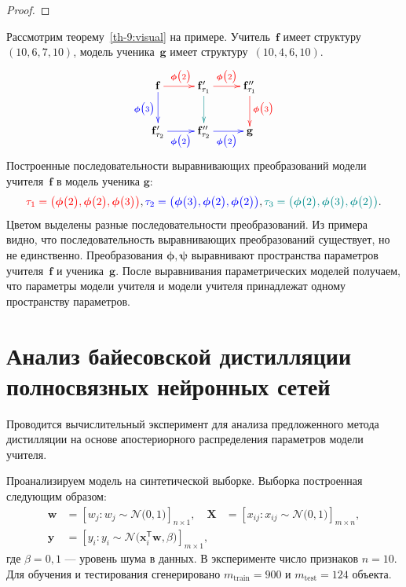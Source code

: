 \begin{proof}
\end{proof}

Рассмотрим теорему~\ref{th-9:visual} на примере. Учитель~$\mathbf{f}$ имеет структуру~$(10, 6, 7, 10)$, модель ученика~$\mathbf{g}$ имеет структуру~$(10,4,6,10)$.
\[
\xymatrix{
\mathbf{f}\ar@[blue][d]_{\color{blue}\bm{\phi}\bigr(3\bigr)}\ar@[red][r]^{\color{red}\bm{\phi}\bigr(2\bigr)}
& 
\mathbf{f}_{\tau_1}'\ar@[darkcyan][d]\ar@[red][r]^{\color{red}\bm{\phi}\bigr(2\bigr)}
&
\mathbf{f}_{\tau_1}''\ar@[red][d]^{\color{red}\bm{\phi}\bigr(3\bigr)}
\\
\mathbf{f}_{\tau_2}'\ar@[blue][r]_{\color{blue}\bm{\phi}\bigr(2\bigr)}
& 
\mathbf{f}_{\tau_2}''\ar@[blue][r]_{\color{blue}\bm{\phi}\bigr(2\bigr)}
&
\mathbf{g}
}
\]
Построенные последовательности выравнивающих преобразований модели учителя~$\mathbf{f}$ в модель ученика $\mathbf{g}$:
\[
{\color{red}\tau_1=\left(\bm{\phi}\bigr(2\bigr), \bm{\phi}\bigr(2\bigr), \bm{\phi}\bigr(3\bigr)\right)}, {\color{blue}\tau_2=\left(\bm{\phi}\bigr(3\bigr), \bm{\phi}\bigr(2\bigr), \bm{\phi}\bigr(2\bigr)\right)}, {\color{darkcyan}\tau_3=\left(\bm{\phi}\bigr(2\bigr), \bm{\phi}\bigr(3\bigr), \bm{\phi}\bigr(2\bigr)\right)}.
\]
Цветом выделены разные последовательности преобразований.
Из примера видно, что последовательность выравнивающих преобразований существует, но не единственно. Преобразования $\bm{\phi}, \bm{\psi}$ выравнивают пространства параметров учителя~$\mathbf{f}$ и ученика~$\mathbf{g}$. После выравнивания параметрических моделей получаем, что параметры модели учителя и модели учителя принадлежат одному пространству параметров.

\section{Анализ байесовской дистилляции полносвязных нейронных сетей}
Проводится вычислительный эксперимент для анализа предложенного метода дистилляции на основе апостериорного распределения параметров модели учителя.

Проанализируем модель на синтетической выборке. Выборка построенная следующим образом:
\[
\label{ch:3:eq:ex:1}
\begin{aligned}
\mathbf{w} &= \left[w_j: w_{j}\sim \mathcal{N}\bigr(0, 1\bigr)\right]_{n\times 1}, \quad \mathbf{X} &= \left[x_{ij}: x_{ij}\sim\mathcal{N}\bigr(0, 1\bigr)\right]_{m\times n}, \\
 \mathbf{y} &= \left[y_i: y_i \sim \mathcal{N}\bigr(\mathbf{x}_i^{\mathsf{T}}\mathbf{w}, \beta\bigr)\right]_{m \times 1},
\end{aligned}
\] 
где $\beta=0{,}1$ --- уровень шума в данных. В эксперименте число признаков $n=10.$ Для обучения и тестирования сгенерировано $m_{\text{train}}=900$ и $m_{\text{test}}=124$ объекта.


